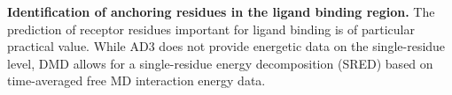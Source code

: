 

\textbf{Identification of anchoring residues in the ligand binding
region.} The prediction of receptor residues important for ligand binding is of
particular practical value. While AD3 does not provide energetic data on the
single-residue level, DMD allows for a single-residue energy decomposition
(SRED) based on time-averaged free MD interaction energy data.


